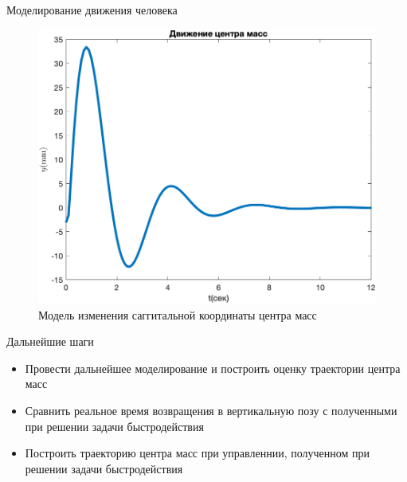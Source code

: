 \documentclass[10pt]{beamer}
\begin{document}
\begin{frame}{Моделирование движения человека}
	\begin{figure}[h!]
		\includegraphics[width=0.7\linewidth]{images/center_mass_my.png}
		\caption{Модель изменения саггитальной координаты центра масс}
	\end{figure}
\end{frame}

\begin{frame}{Дальнейшие шаги}
	\begin{itemize}
		\item Провести дальнейшее моделирование и построить оценку траектории центра масс
		\item Сравнить реальное время возвращения в вертикальную позу с полученными при решении задачи быстродействия
		\item Построить траекторию центра масс при управленнии, полученном при решении задачи быстродействия
	  \end{itemize}
	
\end{frame}
\end{document}
